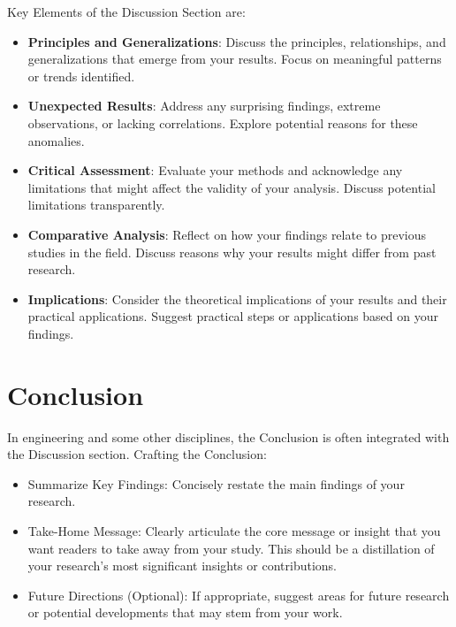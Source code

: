 \documentclass[
    twocolumn,
    fontsize = 10pt,
    parskip = half+,
    headings = small,
    headwidth = text,
    footwidth = text,
]{scrartcl}
\begin{document}
Key Elements of the Discussion Section are:
\begin{itemize}
    \item  \textbf{Principles and Generalizations}: Discuss the principles, relationships, and generalizations that emerge from your results. Focus on meaningful patterns or trends identified. 
    \item  \textbf{Unexpected Results}: Address any surprising findings, extreme observations, or lacking correlations. Explore potential reasons for these anomalies.  
    \item  \textbf{Critical Assessment}: Evaluate your methods and acknowledge any limitations that might affect the validity of your analysis. Discuss potential limitations transparently. 
   \item  \textbf{ Comparative Analysis}: Reflect on how your findings relate to previous studies in the field. Discuss reasons why your results might differ from past research. 
    \item  \textbf{Implications}: Consider the theoretical implications of your results and their practical applications. Suggest practical steps or applications based on your findings. 
\end{itemize}

\section{Conclusion}
In engineering and some other disciplines, the Conclusion is often integrated with the Discussion section.
Crafting the Conclusion:
\begin{itemize}
    \item Summarize Key Findings: Concisely restate the main findings of your research. 
    \item Take-Home Message: Clearly articulate the core message or insight that you want readers to take away from your study. This should be a distillation of your research's most significant insights or contributions.
    \item Future Directions (Optional): If appropriate, suggest areas for future research or potential developments that may stem from your work.
\end{itemize}

\printbibliography

\printglossaries
\appendix
{}

\end{document}

